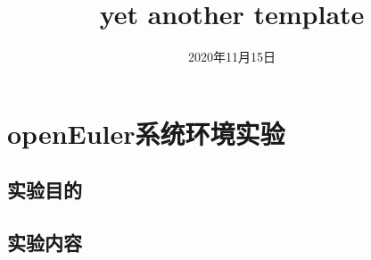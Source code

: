 \documentclass[forprint]{WHUBachelor}
\begin{document}


\title{yet another template} %
\date{2020年11月15日} %


\maketitle
\frontmatter
{}              %


\tableofcontents
\thispagestyle{empty}				%




\mainmatter %
\pagestyle{plain}%
\baselineskip=23pt  %



\chapter{openEuler系统环境实验}
 
 \section{实验目的}

 \section{实验内容}
\end{document}
